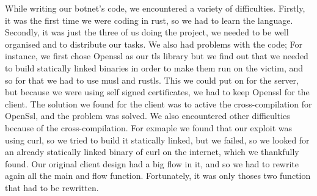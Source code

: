 \documentclass[../main.tex]{subfiles}
\begin{document}
    While writing our botnet's code, we encountered a variety of difficulties.
    Firstly, it was the first time we were coding in rust, so we had to learn the language.
    Secondly, it was just the three of us doing the project, we needed to be well organised and to distribute our tasks.
    We also had problems with the code;
    For instance, we first chose Openssl as our tls library but we find out that we needed to build statically linked binaries in order to make them run on the victim, and so for that we had to use musl and rustls.
    This we could put on for the server, but because we were using self signed certificates, we had to keep Openssl for the client.
    The solution we found for the client was to active the cross-compilation for OpenSsl, and the problem was solved.
    We also encountered other difficulties because of the cross-compilation.
    For exmaple we found that our exploit was using curl, so we tried to build it statically linked, but we failed, so we looked for an already statically linked binary of curl on the internet, which we thankfully found.
    Our original client design had a big flow in it, and so we had to rewrite again all the main and flow function.
    Fortunately, it was only thoses two function that had to be rewritten.
\end{document}
